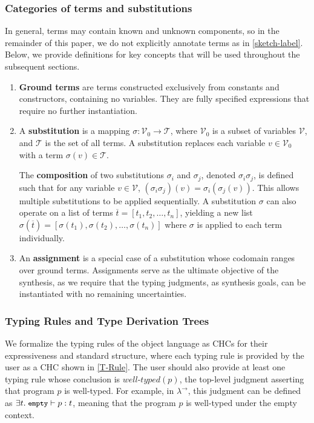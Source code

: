 \documentclass[manuscript,screen]{acmart}
\newcommand{\stlctype}[3]{{#1} \vdash {#2} : {#3}}
\newcommand{\welltyped}[1]{\mathit{well\text{-}typed}\left(#1\right)}
\newcommand{\tcode}[1]{{\small \texttt{\spaceskip=0.2em #1}}}
\newcommand{\stlc}{\lambda^{\rightarrow}}
\begin{document}
\subsubsection{Categories of terms and substitutions} 
In general, terms may contain known and unknown components, so in the remainder of this paper, we do not explicitly annotate terms as in \autoref{sketch-label}. Below, we provide definitions for key concepts that will be used throughout the subsequent sections.
\begin{enumerate}
    \item \textbf{Ground terms} are terms constructed exclusively from constants and constructors, containing no variables. 
    They are fully specified expressions that require no further instantiation.

    \item A \textbf{substitution} is a mapping \(\sigma: \mathcal{V}_0 \to \mathcal{T}\), where \(\mathcal{V}_0\) is a subset of variables \(\mathcal{V}\), and \(\mathcal{T}\) is the set of all terms. A substitution replaces each variable \(v \in \mathcal{V}_0\) with a term \(\sigma(v) \in \mathcal{T}\).

    The \textbf{composition} of two substitutions $\sigma_i$ and $\sigma_j$, denoted $\sigma_i \sigma_j$, is defined such that for any variable $v \in \mathcal{V}$, $(\sigma_i \sigma_j)(v) = \sigma_i(\sigma_j(v))$. 
    This allows multiple substitutions to be applied sequentially.
    A substitution $\sigma$ can also operate on a list of terms $\overline{t} = [t_1, t_2, \ldots, t_n]$, yielding a new list $\sigma(\overline{t}) = [\sigma(t_1), \sigma(t_2), \ldots, \sigma(t_n)]$ where $\sigma$ is applied to each term individually.

    \item An \textbf{assignment} is a special case of a substitution whose codomain ranges over ground terms.
    Assignments serve as the ultimate objective of the synthesis, as we require that the typing judgments, as synthesis goals, can be instantiated with no remaining uncertainties.
\end{enumerate}


\subsubsection{Typing Rules and Type Derivation Trees}
We formalize the typing rules of the object language as CHCs for their expressiveness and standard structure, where each typing rule is provided by the user as a CHC shown in \autoref{T-Rule}.
%
The user should also provide at least one typing rule whose conclusion is $\welltyped{p}$, the top-level judgment asserting that program $p$ is well-typed. For example, in $\stlc$, this judgment can be defined as $\exists t.\; \stlctype{\tcode{empty}}{p}{t}$, meaning that the program $p$ is well-typed under the empty context.
\end{document}
